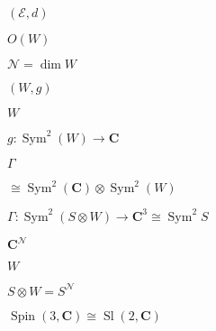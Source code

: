 \begin{preview}
\setcounter{equation}{0}%
\( ( \mathcal{E},d) \)
\end{preview}

\begin{preview}
\setcounter{equation}{0}%
\( O(W) \)
\end{preview}

\begin{preview}
\setcounter{equation}{0}%
\( \mathcal{N} = \dim W  \)
\end{preview}

\begin{preview}
\setcounter{equation}{0}%
\( (W,g) \)
\end{preview}

\begin{preview}
\setcounter{equation}{0}%
\( W \)
\end{preview}

\begin{preview}
\setcounter{equation}{0}%
\( g: \operatorname{Sym}^2(W) \to \mathbf{C} \)
\end{preview}

\begin{preview}
\setcounter{equation}{0}%
\( \Gamma \)
\end{preview}

\begin{preview}
\setcounter{equation}{0}%
\( \cong \operatorname{Sym}^2( \mathbf{C}) \otimes  \operatorname{Sym}^2(W) \)
\end{preview}

\begin{preview}
\setcounter{equation}{0}%
\( \Gamma : \operatorname{Sym}^2(S \otimes W) \to \mathbf{C}^3 \cong \operatorname{Sym}^2 S \)
\end{preview}

\begin{preview}
\setcounter{equation}{0}%
\( \mathbf{C}^{ \mathcal{N}} \)
\end{preview}

\begin{preview}
\setcounter{equation}{0}%
\( W \)
\end{preview}

\begin{preview}
\setcounter{equation}{0}%
\( S \otimes W = S^{\mathcal{N}} \)
\end{preview}

\begin{preview}
\setcounter{equation}{0}%
\( \operatorname{Spin}(3, \mathbf{C})\cong \operatorname{Sl}(2, \mathbf{C}) \)
\end{preview}

